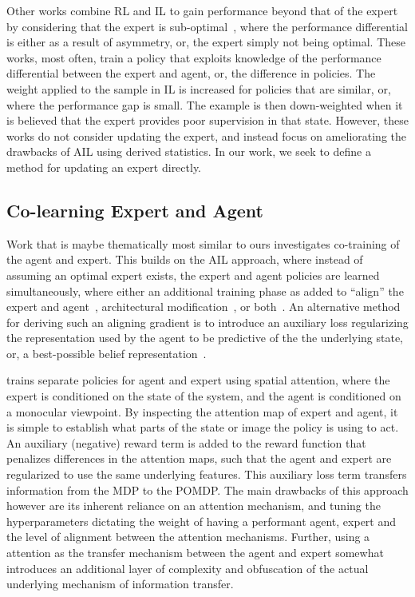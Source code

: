 Other works combine RL and IL to gain performance beyond that of the expert by considering that the expert is sub-optimal~\citep{choudhury2018data, Sun2018, weihs2020bridging}, where the performance differential is either as a result of asymmetry, or, the expert simply not being optimal.  These works, most often, train a policy that exploits knowledge of the performance differential between the expert and agent, or, the difference in policies.  The weight applied to the sample in IL is increased for policies that are similar, or, where the performance gap is small.  The example is then down-weighted when it is believed that the expert provides poor supervision in that state.  However, these works do not consider updating the expert, and instead focus on ameliorating the drawbacks of AIL using derived statistics.  In our work, we seek to define a method for updating an expert directly. 


\subsection{Co-learning Expert and Agent}
Work that is maybe thematically most similar to ours investigates co-training of the agent and expert.  This builds on the AIL approach, where instead of assuming an optimal expert exists, the expert and agent policies are learned simultaneously, where either an additional training phase as added to ``align'' the expert and agent~\citep{salter2019attentionprivileged, Song2019}, architectural modification~\citep{pierrealex2020privileged}, or both~\citep{Schwab2019}.  An alternative method for deriving such an aligning gradient is to introduce an auxiliary loss regularizing the representation used by the agent to be predictive of the the underlying state, or, a best-possible belief representation~\citep{nguyen2020belief}.

\citet{salter2019attentionprivileged} trains separate policies for agent and expert using spatial attention, where the expert is conditioned on the state of the system, and the agent is conditioned on a monocular viewpoint.  By inspecting the attention map of expert and agent, it is simple to establish what parts of the state or image the policy is using to act.  An auxiliary (negative) reward term is added to the reward function that penalizes differences in the attention maps, such that the agent and expert are regularized to use the same underlying features.  This auxiliary loss term transfers information from the MDP to the POMDP.  The main drawbacks of this approach however are its inherent reliance on an attention mechanism, and tuning the hyperparameters dictating the weight of having a performant agent, expert and the level of alignment between the attention mechanisms.  Further, using a attention as the transfer mechanism between the agent and expert somewhat introduces an additional layer of complexity and obfuscation of the actual underlying mechanism of information transfer.

